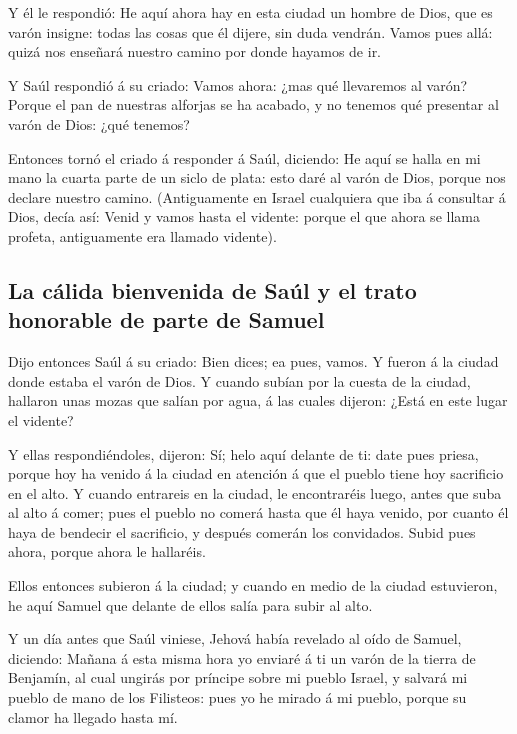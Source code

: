  Y él le respondió: He aquí ahora hay en esta ciudad un
hombre de Dios, que es varón insigne: todas las cosas que él dijere, sin
duda vendrán. Vamos pues allá: quizá nos enseñará nuestro camino por
donde hayamos de ir.

 Y Saúl respondió á su criado: Vamos ahora: ¿mas qué
llevaremos al varón? Porque el pan de nuestras alforjas se ha acabado, y
no tenemos qué presentar al varón de Dios: ¿qué tenemos?

 Entonces tornó el criado á responder á Saúl, diciendo: He
aquí se halla en mi mano la cuarta parte de un siclo de plata: esto daré
al varón de Dios, porque nos declare nuestro camino. 
(Antiguamente en Israel cualquiera que iba á consultar á Dios, decía
así: Venid y vamos hasta el vidente: porque el que ahora se llama
profeta, antiguamente era llamado vidente).

\hypertarget{la-cuxe1lida-bienvenida-de-sauxfal-y-el-trato-honorable-de-parte-de-samuel}{%
\subsection{La cálida bienvenida de Saúl y el trato honorable de parte
de
Samuel}\label{la-cuxe1lida-bienvenida-de-sauxfal-y-el-trato-honorable-de-parte-de-samuel}}

 Dijo entonces Saúl á su criado: Bien dices; ea pues,
vamos. Y fueron á la ciudad donde estaba el varón de Dios. 
Y cuando subían por la cuesta de la ciudad, hallaron unas mozas que
salían por agua, á las cuales dijeron: ¿Está en este lugar el vidente?

 Y ellas respondiéndoles, dijeron: Sí; helo aquí delante de
ti: date pues priesa, porque hoy ha venido á la ciudad en atención á que
el pueblo tiene hoy sacrificio en el alto.  Y cuando
entrareis en la ciudad, le encontraréis luego, antes que suba al alto á
comer; pues el pueblo no comerá hasta que él haya venido, por cuanto él
haya de bendecir el sacrificio, y después comerán los convidados. Subid
pues ahora, porque ahora le hallaréis.

 Ellos entonces subieron á la ciudad; y cuando en medio de
la ciudad estuvieron, he aquí Samuel que delante de ellos salía para
subir al alto.

 Y un día antes que Saúl viniese, Jehová había revelado al
oído de Samuel, diciendo:  Mañana á esta misma hora yo
enviaré á ti un varón de la tierra de Benjamín, al cual ungirás por
príncipe sobre mi pueblo Israel, y salvará mi pueblo de mano de los
Filisteos: pues yo he mirado á mi pueblo, porque su clamor ha llegado
hasta mí.

